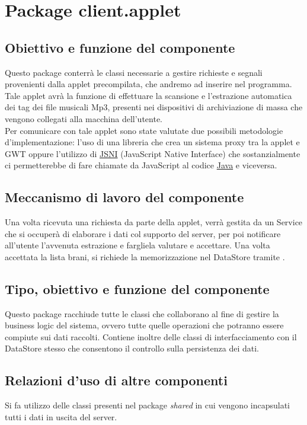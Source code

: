 \newpage
\section{Package client.applet} %
\subsection*{Obiettivo e funzione del componente}
Questo package conterr\`a le classi necessarie a gestire richieste e segnali
provenienti dalla applet precompilata, che andremo ad inserire nel programma.
Tale applet avr\`a la funzione di effettuare la scansione e l'estrazione
automatica dei tag dei file musicali Mp3, presenti nei dispositivi di
archiviazione di massa che vengono collegati alla macchina dell'utente.\\
Per comunicare con tale applet sono state valutate due possibili metodologie
d'implementazione: l'uso di una libreria che crea un sistema proxy tra la applet
e GWT oppure l'utilizzo di \underline{JSNI} (JavaScript Native Interface) che
sostanzialmente ci permetterebbe di fare chiamate da JavaScript al codice
\underline{Java} e viceversa.

\subsection*{Meccanismo di lavoro del componente}
Una volta ricevuta una richiesta da parte della applet, verr\`a gestita da un
Service che si occuper\`a di elaborare i dati col supporto del server, per poi
notificare all'utente l'avvenuta estrazione e fargliela valutare e accettare.
Una volta accettata la lista brani, si richiede la memorizzazione nel DataStore
tramite .


\subsection*{Tipo, obiettivo e funzione del componente} %
Questo package racchiude tutte le classi che collaborano al fine di gestire la
business logic del sistema, ovvero tutte quelle operazioni che potranno essere
compiute sui dati raccolti. Contiene inoltre delle classi di interfacciamento
con il DataStore stesso che consentono il controllo sulla persistenza dei dati.

\subsection*{Relazioni d'uso di altre componenti}
Si fa utilizzo delle classi presenti nel package \emph{shared} in cui vengono
incapsulati tutti i dati in uscita del server.

